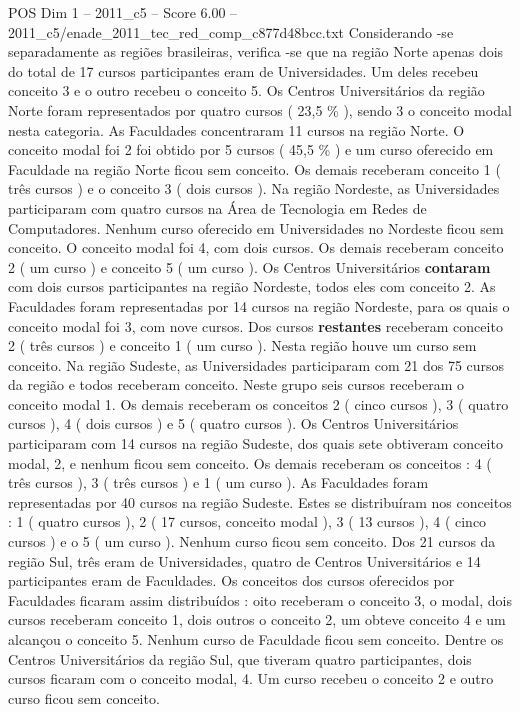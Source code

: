 \begin{textsample}{POS Dim 1 – 2011\_c5 – Score 6.00 – 2011\_c5/enade\_2011\_tec\_red\_comp\_c877d48bcc.txt}
Considerando -se separadamente as regiões brasileiras, verifica -se que na região Norte apenas dois do total de 17 cursos participantes eram de Universidades.
Um deles recebeu conceito 3 e o outro recebeu o conceito 5.
Os Centros Universitários da região Norte foram representados por quatro cursos ( 23,5 \% ), sendo 3 o conceito modal nesta categoria.
As Faculdades concentraram 11 cursos na região Norte.
O conceito modal foi 2 foi obtido por 5 cursos ( 45,5 \% ) e um curso oferecido em Faculdade na região Norte ficou sem conceito.
Os demais receberam conceito 1 ( três cursos ) e o conceito 3 ( dois cursos ).
Na região Nordeste, as Universidades participaram com quatro cursos na Área de Tecnologia em Redes de Computadores.
Nenhum curso oferecido em Universidades no Nordeste ficou sem conceito.
O conceito modal foi 4, com dois cursos.
Os demais receberam conceito 2 ( um curso ) e conceito 5 ( um curso ).
Os Centros Universitários \textbf{contaram} com dois cursos participantes na região Nordeste, todos eles com conceito 2.
As Faculdades foram representadas por 14 cursos na região Nordeste, para os quais o conceito modal foi 3, com nove cursos.
Dos cursos \textbf{restantes} receberam conceito 2 ( três cursos ) e conceito 1 ( um curso ).
Nesta região houve um curso sem conceito.
Na região Sudeste, as Universidades participaram com 21 dos 75 cursos da região e todos receberam conceito.
Neste grupo seis cursos receberam o conceito modal 1.
Os demais receberam os conceitos 2 ( cinco cursos ), 3 ( quatro cursos ), 4 ( dois cursos ) e 5 ( quatro cursos ).
Os Centros Universitários participaram com 14 cursos na região Sudeste, dos quais sete obtiveram conceito modal, 2, e nenhum ficou sem conceito.
Os demais receberam os conceitos : 4 ( três cursos ), 3 ( três cursos ) e 1 ( um curso ).
As Faculdades foram representadas por 40 cursos na região Sudeste.
Estes se distribuíram nos conceitos : 1 ( quatro cursos ), 2 ( 17 cursos, conceito modal ), 3 ( 13 cursos ), 4 ( cinco cursos ) e o 5 ( um curso ).
Nenhum curso ficou sem conceito.
Dos 21 cursos da região Sul, três eram de Universidades, quatro de Centros Universitários e 14 participantes eram de Faculdades.
Os conceitos dos cursos oferecidos por Faculdades ficaram assim distribuídos : oito receberam o conceito 3, o modal, dois cursos receberam conceito 1, dois outros o conceito 2, um obteve conceito 4 e um alcançou o conceito 5.
Nenhum curso de Faculdade ficou sem conceito.
Dentre os Centros Universitários da região Sul, que tiveram quatro participantes, dois cursos ficaram com o conceito modal, 4.
Um curso recebeu o conceito 2 e outro curso ficou sem conceito.

\end{textsample}

